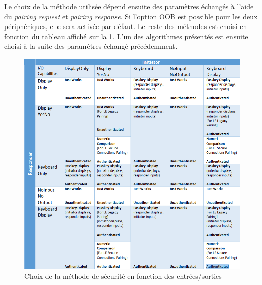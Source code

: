 Le choix de la méthode utilisée dépend ensuite des paramètres échangés à l'aide du \textit{pairing request} et \textit{pairing response}. Si l'option OOB est possible pour les deux périphériques, elle sera activée par défaut. Le reste des méthodes est choisi en fonction du tableau affiché sur la \cref{fig-ble_choose_security}. L'un des algorithmes présentés est ensuite choisi à la suite des paramètres échangé précédemment. \\


\begin{figure}[ht!]
    \centering
    \includegraphics[width=1.0\textwidth]{Figures/Security/BLE/ble_choose_security.png}
    \caption{Choix de la méthode de sécurité en fonction des entrées/sorties}
    \label{fig-ble_choose_security}
\end{figure}

